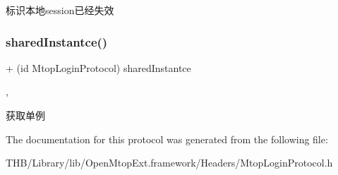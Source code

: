 标识本地session已经失效 \mbox{\label{protocol_mtop_login_protocol_01-p_a64172bdbfef566337b9daa18c6140457}} 
\subsubsection{\texorpdfstring{shared\+Instantce()}{sharedInstantce()}}
{\footnotesize\ttfamily + (id Mtop\+Login\+Protocol) shared\+Instantce \begin{DoxyParamCaption}{ }\end{DoxyParamCaption}\hspace{0.3cm}{\ttfamily [static]}, {\ttfamily [required]}}

获取单例 

The documentation for this protocol was generated from the following file\+:\begin{DoxyCompactItemize}
\item 
T\+H\+B/\+Library/lib/\+Open\+Mtop\+Ext.\+framework/\+Headers/Mtop\+Login\+Protocol.\+h\end{DoxyCompactItemize}
